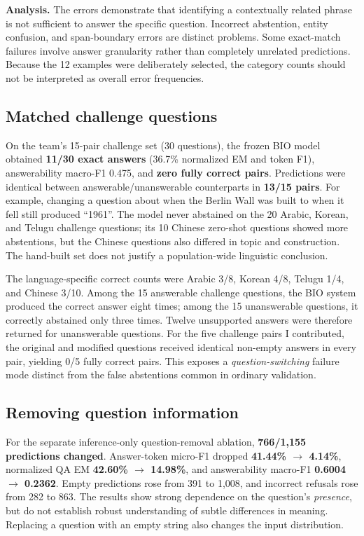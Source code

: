 \documentclass[11pt,a4paper,twocolumn]{article}
\begin{document}
\textbf{Analysis.}
The errors demonstrate that identifying a
contextually related phrase is not sufficient
to answer the specific question. Incorrect
abstention, entity confusion, and span-boundary
errors are distinct problems. Some exact-match
failures involve answer granularity rather than
completely unrelated predictions. Because the
12 examples were deliberately selected, the
category counts should not be interpreted
as overall error frequencies.


\subsection{Matched challenge questions}
On the team's 15-pair challenge set (30 questions), the frozen BIO model obtained \textbf{11/30 exact answers} (36.7\% normalized EM and token F1), answerability macro-F1 0.475, and \textbf{zero fully correct pairs}. Predictions were identical between answerable/unanswerable counterparts in \textbf{13/15 pairs}. For example, changing a question about when the Berlin Wall was built to when it fell still produced ``1961''. The model never abstained on the 20 Arabic, Korean, and Telugu challenge questions; its 10 Chinese zero-shot questions showed more abstentions, but the Chinese questions also differed in topic and construction. The hand-built set does not justify a population-wide linguistic conclusion.

The language-specific correct counts were Arabic 3/8, Korean 4/8, Telugu 1/4, and Chinese 3/10. Among the 15 answerable challenge questions, the BIO system produced the correct answer eight times; among the 15 unanswerable questions, it correctly abstained only three times. Twelve unsupported answers were therefore returned for unanswerable questions. For the five challenge pairs I contributed, the original and modified questions received identical non-empty answers in every pair, yielding 0/5 fully correct pairs. This exposes a \emph{question-switching} failure mode distinct from the false abstentions common in ordinary validation.

\subsection{Removing question information}
For the separate inference-only question-removal ablation, \textbf{766/1,155 predictions changed}. Answer-token micro-F1 dropped \textbf{41.44\% $\rightarrow$ 4.14\%}, normalized QA EM \textbf{42.60\% $\rightarrow$ 14.98\%}, and answerability macro-F1 \textbf{0.6004 $\rightarrow$ 0.2362}. Empty predictions rose from 391 to 1,008, and incorrect refusals rose from 282 to 863. The results show strong dependence on the question's \emph{presence}, but do not establish robust understanding of subtle differences in meaning. Replacing a question with an empty string also changes the input distribution.
\end{document}
